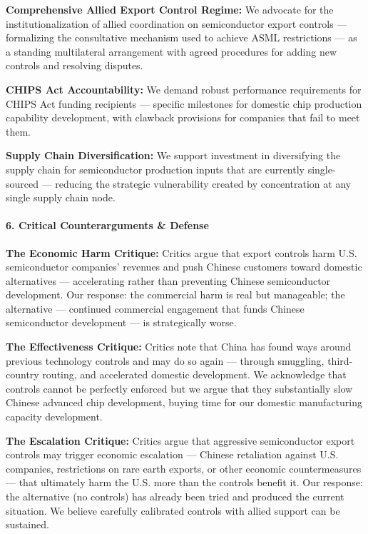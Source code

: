 \textbf{Comprehensive Allied Export Control Regime:} We advocate for the
institutionalization of allied coordination on semiconductor export
controls --- formalizing the consultative mechanism used to achieve ASML
restrictions --- as a standing multilateral arrangement with agreed
procedures for adding new controls and resolving disputes.

\textbf{CHIPS Act Accountability:} We demand robust performance
requirements for CHIPS Act funding recipients --- specific milestones
for domestic chip production capability development, with clawback
provisions for companies that fail to meet them.

\textbf{Supply Chain Diversification:} We support investment in
diversifying the supply chain for semiconductor production inputs that
are currently single-sourced --- reducing the strategic vulnerability
created by concentration at any single supply chain node.

\paragraph{6. Critical Counterarguments \&
Defense}\label{critical-counterarguments-defense-24}

\textbf{The Economic Harm Critique:} Critics argue that export controls
harm U.S. semiconductor companies' revenues and push Chinese customers
toward domestic alternatives --- accelerating rather than preventing
Chinese semiconductor development. Our response: the commercial harm is
real but manageable; the alternative --- continued commercial engagement
that funds Chinese semiconductor development --- is strategically worse.

\textbf{The Effectiveness Critique:} Critics note that China has found
ways around previous technology controls and may do so again --- through
smuggling, third-country routing, and accelerated domestic development.
We acknowledge that controls cannot be perfectly enforced but we argue
that they substantially slow Chinese advanced chip development, buying
time for our domestic manufacturing capacity development.

\textbf{The Escalation Critique:} Critics argue that aggressive
semiconductor export controls may trigger economic escalation ---
Chinese retaliation against U.S. companies, restrictions on rare earth
exports, or other economic countermeasures --- that ultimately harm the
U.S. more than the controls benefit it. Our response: the alternative
(no controls) has already been tried and produced the current situation.
We believe carefully calibrated controls with allied support can be
sustained.

